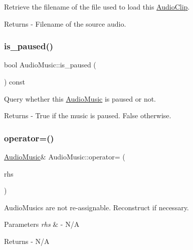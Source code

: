 Retrieve the filename of the file used to load this \mbox{\hyperlink{class_audio_clip}{Audio\+Clip}}. \begin{DoxyReturn}{Returns}
-\/ Filename of the source audio. 
\end{DoxyReturn}
\mbox{\label{class_audio_music_a103d6a71de74441ad5b63fec5f50d656}} 
\subsubsection{\texorpdfstring{is\+\_\+paused()}{is\_paused()}}
{\footnotesize\ttfamily bool Audio\+Music\+::is\+\_\+paused (\begin{DoxyParamCaption}{ }\end{DoxyParamCaption}) const}

Query whether this \mbox{\hyperlink{class_audio_music}{Audio\+Music}} is paused or not. \begin{DoxyReturn}{Returns}
-\/ True if the music is paused. False otherwise. 
\end{DoxyReturn}
\mbox{\label{class_audio_music_a9487a5b790ede77cc96efd6e70322253}} 
\subsubsection{\texorpdfstring{operator=()}{operator=()}}
{\footnotesize\ttfamily \mbox{\hyperlink{class_audio_music}{Audio\+Music}}\& Audio\+Music\+::operator= (\begin{DoxyParamCaption}\item[{const \mbox{\hyperlink{class_audio_music}{Audio\+Music}} \&}]{rhs }\end{DoxyParamCaption})\hspace{0.3cm}{\ttfamily [delete]}}

Audio\+Musics are not re-\/assignable. Reconstruct if necessary. 
\begin{DoxyParams}{Parameters}
{\em rhs} & -\/ N/A \\
\hline
\end{DoxyParams}
\begin{DoxyReturn}{Returns}
-\/ N/A 
\end{DoxyReturn}
\mbox{\label{class_audio_music_a9867971e26b4d081936287af1923fd1a}} 
